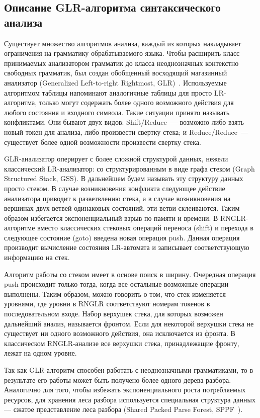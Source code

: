 \subsection{Описание GLR-алгоритма синтаксического анализа}
Существует множество алгоритмов анализа, каждый из которых накладывает ограничения 
на грамматику обрабатываемого языка. Чтобы расширить класс принимаемых анализатором
грамматик до класса неоднозначных контекстно свободных грамматик, был создан 
обобщенный восходящий магазинный анализатор (Generalized Left-to-right Rightmost,
GLR)~\cite{Tomita:1985:EPN:537456}. Используемые алгоритмом таблицы напоминают аналогичные таблицы для просто 
LR-алгоритма, только могут содержать более одного возможного действия для любого 
состояния и входного символа. Такие ситуации принято называть конфликтами. Они 
бывают двух видов: Shift/Reduce~— возможно либо взять новый токен для анализа,
либо произвести свертку стека; и Reduce/Reduce~— существует более одной возможности 
произвести свертку стека. 

GLR-анализатор оперирует с более сложной структурой данных, нежели классический 
LR-анализатор: со структурированным в виде графа стеком (Graph Structured Stack, GSS). 
В дальнейшем будем называть эту структуру данных просто стеком.  В случае возникновения 
конфликта следующее действие анализатора приводит к разветвлению стека, а в случае 
возникновения на вершинах двух ветвей одинаковых состояний, эти ветви склеиваются.
Таким образом избегается экспоненциальный взрыв по памяти и времени. В RNGLR-алгоритме 
вместо классических стековых операций переноса (shift) и перехода в следующее состояние 
(goto) введена новая операция push. Данная операция производит вычисление состояния 
LR-автомата и записывает соответствующую информацию на стек. 

Алгоритм работы со стеком имеет в основе поиск в ширину. Очередная операция push 
происходит только тогда, когда все остальные возможные операции выполнены. Таким 
образом, можно говорить о том, что стек изменяется уровнями, где уровни в RNGLR 
соответствуют номерам токенов в последовательном входе. Набор верхушек стека, для 
которых возможен дальнейший анализ, называется фронтом. Если для некоторой верхушки 
стека не существует ни одного возможного действия, она исключается из фронта. В 
классическом RNGLR-анализе все верхушки стека, принадлежащие фронту, лежат на одном 
уровне.

Так как GLR-алгоритм способен работать с неоднозначными грамматиками, то в результате 
его работы может быть получено более одного дерева разбора. Аналогично для того, 
чтобы избежать экспоненциального роста потребляемых ресурсов, для хранения леса 
разбора используется специальная структура данных — сжатое представление леса разбора 
(Shared Packed Parse Forest, SPPF~\cite{rekers1992parser}). 

